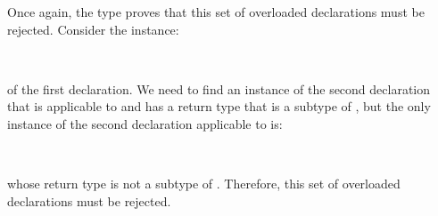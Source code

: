 Once again, the type  proves that this set of overloaded declarations must be rejected. Consider the instance:
\begin{FortressCode}
{\tt ~~}\+\, \llbracket{}\rrbracket\COLON{}\llbracket{}\rrbracket\-
\end{FortressCode}
of the first declaration. We need to find an instance of the second declaration that is applicable to 
and has a return type that is a subtype of ,
but the only instance of the second declaration applicable to  is:
\begin{FortressCode}
{\tt ~~}\+\, \llbracket{}\rrbracket\COLON{}\llbracket{}\rrbracket\-
\end{FortressCode}
whose return type is not a subtype of .
Therefore, this set of overloaded declarations must be rejected.
